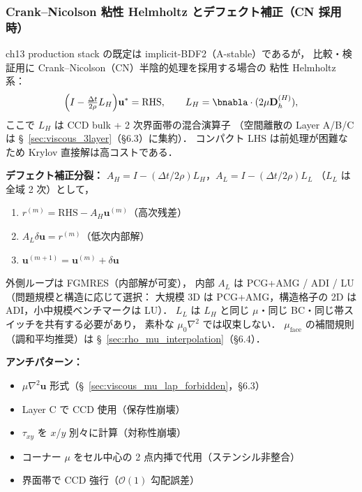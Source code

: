 \subsubsection{Crank--Nicolson 粘性 Helmholtz とデフェクト補正（CN 採用時）}
\label{sec:viscous_cn_defect_v7}
\label{sec:viscous_cn_defect}%
\label{eq:viscous_cn_helmholtz}%

ch13 production stack の既定は implicit-BDF2（A-stable）であるが，
比較・検証用に Crank--Nicolson（CN）半陰的処理を採用する場合の
粘性 Helmholtz 系：
\begin{equation}
  \Bigl(I - \tfrac{\Delta t}{2\rho}L_H\Bigr)\mathbf{u}^*
  = \text{RHS},
  \qquad L_H = \bnabla\cdot(2\mu\mathbf{D}_h^{(H)}),
  \label{eq:viscous_cn_helmholtz_v7}
\end{equation}
ここで $L_H$ は CCD bulk + 2 次界面帯の混合演算子
（空間離散の Layer A/B/C は \S~\ref{sec:viscous_3layer}（§6.3）に集約）．
コンパクト LHS は前処理が困難なため Krylov 直接解は高コストである．

\noindent\textbf{デフェクト補正分裂：}
$A_H = I - (\Delta t/2\rho)L_H$，$A_L = I - (\Delta t/2\rho)L_L$
（$L_L$ は全域 2 次）として，
\begin{enumerate}
  \item $r^{(m)} = \text{RHS} - A_H\mathbf{u}^{(m)}$（高次残差）
  \item $A_L\delta\mathbf{u} = r^{(m)}$（低次内部解）
  \item $\mathbf{u}^{(m+1)} = \mathbf{u}^{(m)} + \delta\mathbf{u}$
\end{enumerate}
外側ループは FGMRES（内部解が可変），
内部 $A_L$ は PCG+AMG / ADI / LU（問題規模と構造に応じて選択：
大規模 3D は PCG+AMG，構造格子の 2D は ADI，小中規模ベンチマークは LU）．
$L_L$ は $L_H$ と同じ $\mu$・同じ BC・同じ帯スイッチを共有する必要があり，
素朴な $\mu_0\nabla^2$ では収束しない．
$\mu_\text{face}$ の補間規則（調和平均推奨）は \S~\ref{sec:rho_mu_interpolation}（§6.4）．

\noindent\textbf{アンチパターン：}
\begin{itemize}
  \item $\mu\nabla^2\mathbf{u}$ 形式（\S~\ref{sec:viscous_mu_lap_forbidden}，§6.3）
  \item Layer C で CCD 使用（保存性崩壊）
  \item $\tau_{xy}$ を $x$/$y$ 別々に計算（対称性崩壊）
  \item コーナー $\mu$ をセル中心の 2 点内挿で代用（ステンシル非整合）
  \item 界面帯で CCD 強行（$\mathcal{O}(1)$ 勾配誤差）
\end{itemize}


